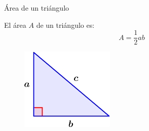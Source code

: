 \begin{infocard}{Área de un triángulo}
    \begin{minipage}{0.55\textwidth}
        El área $A$ de un triángulo es:
        \[A=\frac{1}{2}ab\]
    \end{minipage}\hfill
    \begin{minipage}{0.5\textwidth}
        \begin{figure}[H]
            \centering
            \includegraphics[width=0.5\linewidth]{../images/triangulo_perimetro.png}
            \caption{}
            \label{fig:20230402132954}
        \end{figure}
    \end{minipage}
\end{infocard}
